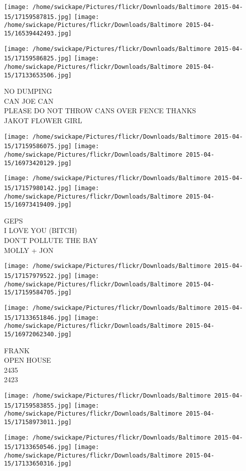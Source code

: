 \documentclass[10pt,letterpaper]{article}
\begin{document}
\texttt{[image: /home/swickape/Pictures/flickr/Downloads/Baltimore 2015-04-15/17159587815.jpg]}
\texttt{[image: /home/swickape/Pictures/flickr/Downloads/Baltimore 2015-04-15/16539442493.jpg]}

\texttt{[image: /home/swickape/Pictures/flickr/Downloads/Baltimore 2015-04-15/17159586825.jpg]}
\texttt{[image: /home/swickape/Pictures/flickr/Downloads/Baltimore 2015-04-15/17133653506.jpg]}

NO DUMPING\\
CAN JOE CAN\\
PLEASE DO NOT THROW CANS OVER FENCE THANKS\\
JAKOT FLOWER GIRL
\pagebreak

\texttt{[image: /home/swickape/Pictures/flickr/Downloads/Baltimore 2015-04-15/17159586075.jpg]}
\texttt{[image: /home/swickape/Pictures/flickr/Downloads/Baltimore 2015-04-15/16973420129.jpg]}

\texttt{[image: /home/swickape/Pictures/flickr/Downloads/Baltimore 2015-04-15/17157980142.jpg]}
\texttt{[image: /home/swickape/Pictures/flickr/Downloads/Baltimore 2015-04-15/16973419409.jpg]}

GEPS\\
I LOVE YOU (BITCH)\\
DON'T POLLUTE THE BAY\\
MOLLY + JON
\pagebreak

\texttt{[image: /home/swickape/Pictures/flickr/Downloads/Baltimore 2015-04-15/17157979522.jpg]}
\texttt{[image: /home/swickape/Pictures/flickr/Downloads/Baltimore 2015-04-15/17159584705.jpg]}

\texttt{[image: /home/swickape/Pictures/flickr/Downloads/Baltimore 2015-04-15/17133651846.jpg]}
\texttt{[image: /home/swickape/Pictures/flickr/Downloads/Baltimore 2015-04-15/16972062340.jpg]}

FRANK\\
OPEN HOUSE\\
2435\\
2423
\pagebreak

\texttt{[image: /home/swickape/Pictures/flickr/Downloads/Baltimore 2015-04-15/17159583855.jpg]}
\texttt{[image: /home/swickape/Pictures/flickr/Downloads/Baltimore 2015-04-15/17158973011.jpg]}

\texttt{[image: /home/swickape/Pictures/flickr/Downloads/Baltimore 2015-04-15/17133650546.jpg]}
\texttt{[image: /home/swickape/Pictures/flickr/Downloads/Baltimore 2015-04-15/17133650316.jpg]}
\end{document}

